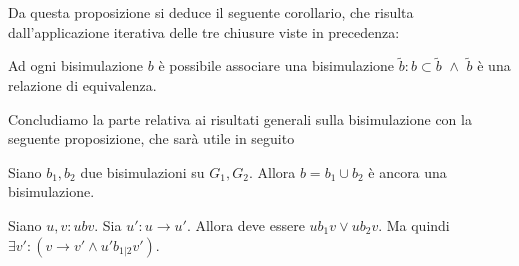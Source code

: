 Da questa proposizione si deduce il seguente corollario, che risulta dall'applicazione iterativa delle tre chiusure viste in precedenza:
\begin{corollary}
    Ad ogni bisimulazione $b$ è possibile associare una bisimulazione $\widetilde{b} : b \subset \widetilde{b} \,\,\land\,\, \widetilde{b}$ è una relazione di equivalenza.
    \label{cor:bisimulation_eqrel}
\end{corollary}
Concludiamo la parte relativa ai risultati generali sulla bisimulazione con la seguente proposizione, che sarà utile in seguito
\begin{proposition}
    Siano $b_1, b_2$ due bisimulazioni su $G_1, G_2$. Allora $b = b_1 \cup b_2$ è ancora una bisimulazione.
    \label{obs:bisimulation_union}
\end{proposition}
\begin{proof2}
    Siano $u,v : u b v$. Sia $u' : u \to u'$. Allora deve essere $u b_1 v \lor u b_2 v$. Ma quindi $\exists v' : (v \to v' \land u' b_{1|2} v')$.
\end{proof2}

